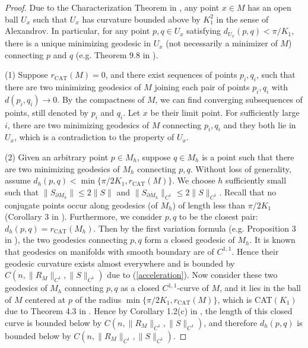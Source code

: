 \documentclass[11pt,letterpaper]{amsart}
\numberwithin{equation}{section}
\theoremstyle{definition}
\theoremstyle{plain}
\theoremstyle{definition}
\theoremstyle{plain}
\theoremstyle{definition}
\theoremstyle{plain}
\begin{document}
\begin{proof}
Due to the Characterization Theorem in \cite{ABB2}, any point $x\in M$ has an open ball $U_x$ such that $U_x$ has curvature bounded above by $K_1^2$ in the sense of Alexandrov. In particular, for any point $p,q\in U_x$ satisfying $d_{U_x}(p,q)<\pi/K_1$, there is a unique minimizing geodesic in $U_x$ (not necessarily a minimizer of $M$) connecting $p$ and $q$ (e.g. Theorem 9.8 in \cite{AKP}). 

\smallskip
\noindent (1) Suppose $r_{\textrm{CAT}}(M)=0$, and there exist sequences of points $p_i,q_i$, such that there are two minimizing geodesics of $M$ joining each pair of points $p_i,q_i$ with $d(p_i,q_i)\to 0$. By the compactness of $M$, we can find converging subsequences of points, still denoted by $p_i$ and $q_i$. Let $x$ be their limit point. For sufficiently large $i$, there are two minimizing geodesics of $M$ connecting $p_i,q_i$ and they both lie in $U_x$, which is a contradiction to the property of $U_x$.

\smallskip
\noindent (2) Given an arbitrary point $p\in M_h$, suppose $q\in M_h$ is a point such that there are two minimizing geodesics of $M_h$ connecting $p,q$. 
Without loss of generality, assume $d_h(p,q)<\min\{\pi/2K_1,r_{\textrm{CAT}}(M)\}$. 
We choose $h$ sufficiently small such that $\|S_{\partial M_h}\|\leqslant 2\|S\|$ and $\|S_{\partial M_h}\|_{C^1}\leqslant 2\|S\|_{C^1}$.
Recall that no conjugate points occur along geodesics (of $M_h$) of length less than $\pi/2K_1$ (Corollary 3 in \cite{ABB2}).
Furthermore, we consider $p,q$ to be the closest pair: $d_h(p,q)=r_{\textrm{CAT}}(M_h)$.
Then by the first variation formula (e.g. Proposition 3 in \cite{ABB2}), the two geodesics connecting $p,q$ form a closed geodesic of $M_h$.  It is known that geodesics on manifolds with smooth boundary are of $C^{1,1}$. Hence their geodesic curvature exists almost everywhere and is bounded by $C(n,\|R_M\|_{C^1},\|S\|_{C^1})$ due to (\ref{acceleration}). Now consider these two geodesics of $M_h$ connecting $p,q$ as a closed $C^{1,1}$-curve of $M$, and it lies in the ball of $M$ centered at $p$ of the radius $\min\{\pi/2K_1,r_{\textrm{CAT}}(M)\}$, which is CAT$(K_1)$ due to Theorem 4.3 in \cite{AB}.
Hence by Corollary 1.2(c) in \cite{AB}, the length of this closed curve is bounded below by $C(n,\|R_M\|_{C^1},\|S\|_{C^1})$, and therefore $d_h(p,q)$ is bounded below by $C(n,\|R_M\|_{C^1},\|S\|_{C^1})$.


\end{proof}
\end{document}
